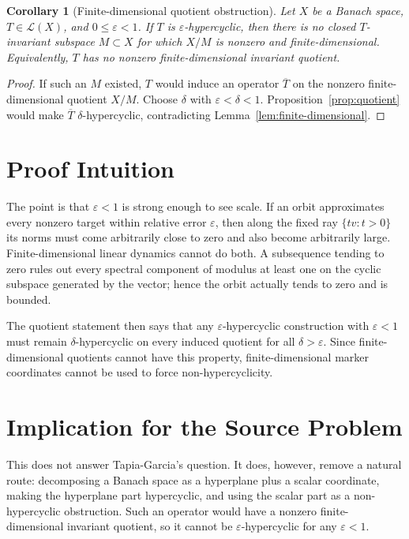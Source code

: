 \documentclass[11pt]{article}
\newtheorem{corollary}{Corollary}
\newcommand{\eps}{\varepsilon}
\begin{document}
\begin{corollary}[Finite-dimensional quotient obstruction]
\label{cor:finite-quotient}
Let \(X\) be a Banach space, \(T\in\mathcal L(X)\), and \(0\leq\eps<1\).  If
\(T\) is \(\eps\)-hypercyclic, then there is no closed \(T\)-invariant subspace
\(M\subset X\) for which \(X/M\) is nonzero and finite-dimensional.
Equivalently, \(T\) has no nonzero finite-dimensional invariant quotient.
\end{corollary}

\begin{proof}
If such an \(M\) existed, \(T\) would induce an operator \(\overline T\) on the
nonzero finite-dimensional quotient \(X/M\).  Choose
\(\delta\) with \(\eps<\delta<1\).  Proposition~\ref{prop:quotient} would make
\(\overline T\) \(\delta\)-hypercyclic, contradicting
Lemma~\ref{lem:finite-dimensional}.
\end{proof}

\section*{Proof Intuition}

The point is that \(\eps<1\) is strong enough to see scale.  If an orbit
approximates every nonzero target within relative error \(\eps\), then along
the fixed ray \(\{t v:t>0\}\) its norms must come arbitrarily close to zero
and also become arbitrarily large.  Finite-dimensional linear dynamics cannot
do both.  A subsequence tending to zero rules out every spectral component of
modulus at least one on the cyclic subspace generated by the vector; hence the
orbit actually tends to zero and is bounded.

The quotient statement then says that any \(\eps\)-hypercyclic construction
with \(\eps<1\) must remain \(\delta\)-hypercyclic on every induced quotient
for all \(\delta>\eps\).  Since finite-dimensional quotients cannot have this
property, finite-dimensional marker coordinates cannot be used to force
non-hypercyclicity.

\section*{Implication for the Source Problem}

This does not answer Tapia-Garcia's question.  It does, however, remove a
natural route: decomposing a Banach space as a hyperplane plus a scalar
coordinate, making the hyperplane part hypercyclic, and using the scalar part
as a non-hypercyclic obstruction.  Such an operator would have a nonzero
finite-dimensional invariant quotient, so it cannot be \(\eps\)-hypercyclic
for any \(\eps<1\).
\end{document}
